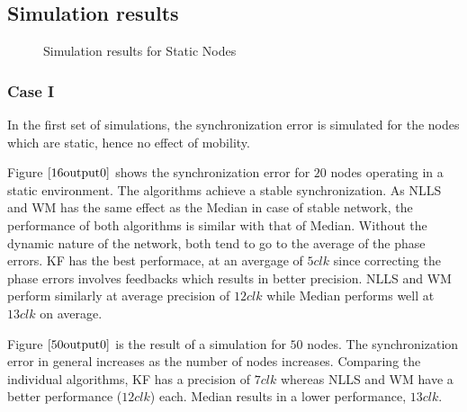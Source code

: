 \documentclass[journal]{IEEEtran}
\begin{document}
\subsection{\textbf{Simulation results}}
\begin{figure}
\centerline{
\hfil
{}}
\caption{Simulation results for Static Nodes }
\label{static}
\end{figure}
\subsubsection{\textbf{Case I}} In the first set of simulations, the synchronization error is simulated for the nodes which are static, hence no effect of mobility. 
\par
Figure $\ref{16output0}$ shows the synchronization error for $20$ nodes operating in a static environment. The algorithms achieve a stable synchronization. As NLLS and WM has the same effect as the Median in case of stable network, the performance of both algorithms is similar with that of Median. Without the dynamic nature of the network, both tend to go to the average of the phase errors. KF has the best performace, at an avergage of $5clk$ since correcting the phase errors involves feedbacks which results in better precision. NLLS and WM perform similarly at average precision of $12clk$ while Median performs well at $13clk$ on average.
\par
Figure $\ref{50output0}$ is the result of a simulation for $50$ nodes. The synchronization error in general increases as the number of nodes increases. Comparing the individual algorithms, KF has a precision of $7clk$ whereas NLLS and WM have a better performance ($12clk$) each. Median results in a lower performance, $13clk$.
\end{document}
